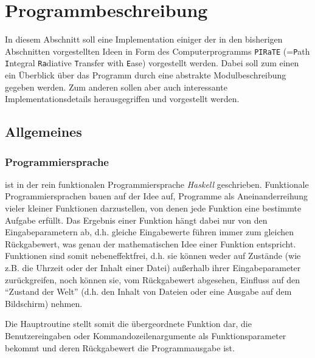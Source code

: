 	\chapter{Programmbeschreibung}\label{cha:program_description}
	In diesem Abschnitt soll eine Implementation einiger der in den bisherigen Abschnitten vorgestellten Ideen in Form des Computerprogramms \texttt{PIRaTE} (=\texttt{P}ath \texttt{I}ntegral \texttt{Ra}diative \texttt{T}ransfer with \texttt{E}ase) vorgestellt werden. Dabei soll zum einen ein Überblick über das Programm durch eine abstrakte Modulbeschreibung gegeben werden. Zum anderen sollen aber auch interessante Implementationsdetails herausgegriffen und vorgestellt werden.
	
	
	\section{Allgemeines}
	\subsection{Programmiersprache}
	\pirate ist in der rein funktionalen Programmiersprache {\em Haskell} geschrieben. Funktionale Programmiersprachen bauen auf der Idee auf, Programme als Aneinanderreihung vieler kleiner Funktionen darzustellen, von denen jede Funktion eine bestimmte Aufgabe erfüllt. Das Ergebnis einer Funktion hängt dabei nur von den Eingabeparametern ab, d.h. gleiche Eingabewerte führen immer zum gleichen Rückgabewert, was genau der mathematischen Idee einer Funktion entspricht. Funktionen sind somit nebeneffektfrei, d.h. sie können weder auf Zustände (wie z.B. die Uhrzeit oder der Inhalt einer Datei) außerhalb ihrer Eingabeparameter zurückgreifen, noch können sie, vom Rückgabewert abgesehen, Einfluss auf den ``Zustand der Welt'' (d.h. den Inhalt von Dateien oder eine Ausgabe auf dem Bildschirm) nehmen.
	
	Die Hauptroutine stellt somit die übergeordnete Funktion dar, die Benutzereingaben oder Kommandozeilenargumente als Funktionsparameter bekommt und deren Rückgabewert die Programmausgabe ist.
	
